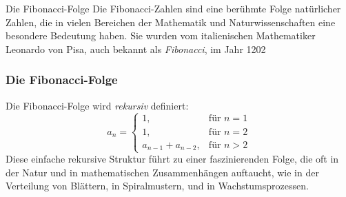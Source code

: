 \documentclass{beamer}
\begin{document}
\begin{frame}{Die Fibonacci-Folge}
    Die Fibonacci-Zahlen sind eine berühmte Folge natürlicher Zahlen, die in vielen Bereichen der Mathematik und Naturwissenschaften eine besondere Bedeutung haben. Sie wurden vom italienischen Mathematiker Leonardo von Pisa, auch bekannt als \emph{Fibonacci}, im Jahr 1202 
\end{frame}
\begin{frame}
\frametitle{Die Fibonacci-Folge}

Die Fibonacci-Folge wird \textit{rekursiv} definiert:
\[
a_n = 
\begin{cases}
1, & \text{für } n = 1 \\
1, & \text{für } n = 2 \\
a_{n-1} + a_{n-2}, & \text{für } n > 2
\end{cases}
\]
    Diese einfache rekursive Struktur führt zu einer faszinierenden Folge, die oft in der Natur und in mathematischen Zusammenhängen auftaucht, wie in der Verteilung von Blättern, in Spiralmustern, und in Wachstumsprozessen.

\end{frame}
\end{document}
